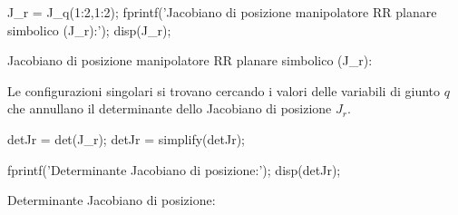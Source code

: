 \documentclass[11pt, a4paper]{article}
\begin{document}
\begin{matlabcode}
J_r = J_q(1:2,1:2);
fprintf('Jacobiano di posizione manipolatore RR planare simbolico (J_r):');
disp(J_r);
\end{matlabcode}
\begin{matlaboutput}
Jacobiano di posizione manipolatore RR planare simbolico (J_r):
\end{matlaboutput}

\begin{par}
\begin{flushleft}
Le configurazioni singolari si trovano cercando i valori delle variabili di giunto $q$ che annullano il determinante dello Jacobiano di posizione $J_r$.
\end{flushleft}
\end{par}

\begin{matlabcode}
detJr = det(J_r);
detJr = simplify(detJr);

fprintf('Determinante Jacobiano di posizione:');
disp(detJr);
\end{matlabcode}

\begin{matlaboutput}
Determinante Jacobiano di posizione:
\end{matlaboutput}
\end{document}
